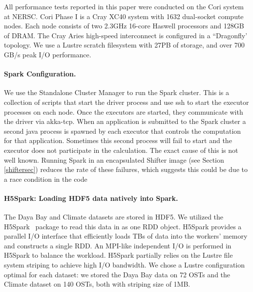 All performance tests reported in this paper were conducted on the Cori system at NERSC. Cori Phase I is a Cray XC40 system with 1632 dual-socket compute nodes. Each node consists of two 2.3GHz 16-core Haswell processors and 128GB of DRAM. The Cray Aries high-speed interconnect is configured in a ``Dragonfly' topology. We use a Lustre scratch filesystem with 27PB of storage, and over 700 GB/s peak I/O performance. 

\paragraph{Spark Configuration.}
We use the Standalone Cluster Manager to run the Spark cluster. This is a collection of scripts that start the driver process and use ssh to start the executor processes on each node. Once the executors are started, they communicate with the driver via akka-tcp. When an application is submitted to the Spark cluster a second java process is spawned by each executor that controls the computation for that application. Sometimes this second process will fail to start and the executor does not participate in the calculation. The exact cause of this is not well known. Running Spark in an encapsulated Shifter image (see Section \ref{shiftersec}) reduces the rate of these failures, which suggests this could be due to a race condition in the code

\paragraph{H5Spark: Loading HDF5 data natively into Spark.}
The Daya Bay and Climate datasets are stored in HDF5. We utilized the H5Spark~\cite{h5spark-cug16} package to read this data in as one RDD object. H5Spark provides a parallel I/O interface that efficiently loads TBs of data into the workers' memory and constructs a single RDD. An MPI-like independent I/O is performed in H5Spark to balance the workload. H5Spark partially relies on the Lustre file system striping to achieve high I/O bandwidth. We chose a Lustre configuration optimal for each dataset: we stored the Daya Bay data on 72 OSTs and the Climate dataset on 140 OSTs, both with striping size of 1MB. 

